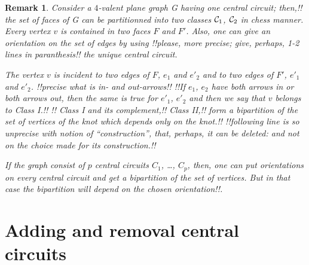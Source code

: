 \documentclass[12pt]{article}
\newtheorem{remark}{Remark}
\begin{document}
\begin{remark}
Consider a $4$-valent plane graph G having one central circuit;
then,!! the set of faces of G can be partitionned into two classes
${\cal C}_1$, ${\cal C}_2$ in chess manner. Every vertex $v$ is 
contained in two faces $F$ and $F'$. Also, one can give an 
orientation on the set of edges 
by using !!please, more precise; give, perhaps, 1-2 lines in paranthesis!! 
the unique central circuit.

The vertex $v$ is incident to two edges of $F$, $e_1$ and $e'_2$ 
and to two edges of $F'$, $e'_1$ and $e'_2$. 
!!precise what is in- and out-arrows!!
!!If $e_1$, $e_2$ have both arrows in or both arrows out, then 
the same is true for $e'_1$, $e'_2$ and then we say that $v$ 
{\em belongs to Class I}.!! 
!!%
Class I and its complement,!! Class II,!! form a bipartition
of the set of vertices of the knot which depends only on the knot.!!
!!following line is so unprecise with notion of ``construction'', that, 
perhaps, it can be deleted: 
and not on the choice made for its construction.!!

If the graph consist of $p$ central circuits $C_1$, \dots, $C_p$,
then, one can put orientations on every central circuit and get
a bipartition of the set of vertices. But in that case the 
bipartition will depend on the chosen orientation!!.
\end{remark}


\section{Adding and removal central circuits}


%
%
%
%
%
\end{document}
